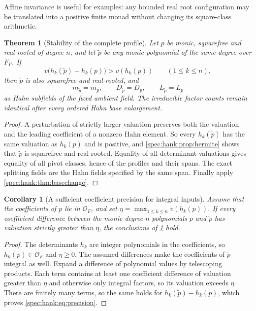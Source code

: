 \documentclass[11pt,a4paper]{article}
\numberwithin{equation}{section}
\newtheorem{theorem}{Theorem}[section]
\newtheorem{corollary}[corollary]{Corollary}
\theoremstyle{definition}
\theoremstyle{remark}
\newcommand{\OO}{\mathcal O}
\begin{document}
Affine invariance is useful for examples: any bounded real root configuration
may be translated into a positive finite monad without changing its
square-class arithmetic.

\begin{theorem}[Stability of the complete profile]\label{spec:hank:thm:precision}
Let $p$ be monic, squarefree and real-rooted of degree $n$, and let $\tilde p$
be any monic polynomial of the same degree over $F_\Gamma$. If
\begin{equation}\label{spec:hank:eq:precision}
 v\bigl(h_k(\tilde p)-h_k(p)\bigr)>v(h_k(p))
       \qquad(1\le k\le n),
\end{equation}
then $\tilde p$ is also squarefree and real-rooted, and
\[
 m_{\tilde p}=m_p,\qquad D_{\tilde p}=D_p,\qquad L_{\tilde p}=L_p
\]
as Hahn subfields of the fixed ambient field. The irreducible factor counts
remain identical after every ordered Hahn base enlargement.
\end{theorem}
\begin{proof}
A perturbation of strictly larger valuation preserves both the valuation and
the leading coefficient of a nonzero Hahn element. So every $h_k(\tilde p)$
has the same valuation as $h_k(p)$ and is positive, and
\cref{spec:hank:prop:hermite} shows that $\tilde p$ is squarefree and
real-rooted. Equality of all determinant valuations gives equality of all
pivot classes, hence of the profiles and their spans. The exact splitting
fields are the Hahn fields specified by the same span. Finally apply
\cref{spec:hank:thm:basechange}.
\end{proof}

\begin{corollary}[A sufficient coefficient precision for integral inputs]
\label{spec:hank:cor:coeffprecision}
Assume that the coefficients of $p$ lie in $\OO_F$, and set
$\eta=\max_{1\le k\le n}v(h_k(p))$. If every coefficient difference between
the monic degree-$n$ polynomials $p$ and $\tilde p$ has valuation strictly
greater than $\eta$, the conclusions of \cref{spec:hank:thm:precision} hold.
\end{corollary}
\begin{proof}
The determinants $h_k$ are integer polynomials in the coefficients, so
$h_k(p)\in\OO_F$ and $\eta\ge0$. The assumed differences make the coefficients
of $\tilde p$ integral as well. Expand a difference of polynomial values by
telescoping products. Each term contains at least one coefficient difference
of valuation greater than $\eta$ and otherwise only integral factors, so its
valuation exceeds $\eta$. There are finitely many terms, so the same holds for
$h_k(\tilde p)-h_k(p)$, which proves \eqref{spec:hank:eq:precision}.
\end{proof}
\end{document}
